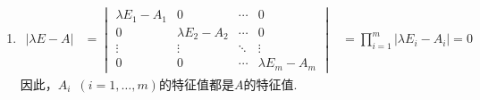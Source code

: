 \documentclass[12pt,fontset=fandol]{ctexart}
\begin{document}
\begin{solve}
\begin{enumerate}
        \item \begin{align*}
                  |\lambda E-A| & =\begin{vmatrix}
                                       \lambda E_1-A_1 & 0               & \cdots & 0               \\
                                       0               & \lambda E_2-A_2 & \cdots & 0               \\
                                       \vdots          & \vdots          & \ddots & \vdots          \\
                                       0               & 0               & \cdots & \lambda E_m-A_m
                                   \end{vmatrix}
                                & =\prod_{i=1}^{m}|\lambda E_i-A_i|=0
              \end{align*}
              因此，$A_i\enspace(i=1,\ldots,m)$的特征值都是$A$的特征值.
    \end{enumerate}
\end{solve}
\end{document}
